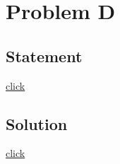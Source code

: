 \section{Problem D}
    \subsection{Statement}
        {\color{blue} \href{http://hsin.hr/coci/archive/2006_2007/contest3_tasks.pdf}{click}}

    \subsection{Solution}
        {\color{blue} \href{http://hsin.hr/coci/archive/2006_2007/contest3_solutions.zip}{click}}
